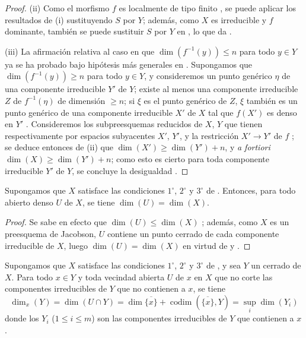 \begin{proof}
(ii) Como el morfismo $f$ es localmente de tipo finito , se puede aplicar los resultados de (i) sustituyendo $S$ por $Y$; además, como $X$ es irreducible y $f$ dominante, también se puede sustituir $S$ por $Y$ en , lo que da .

(iii) La afirmación relativa al caso en que $\dim(f^{-1}(y))\leq n$ para todo $y\in Y$ ya se ha probado bajo hipótesis más generales en .
Supongamos que $\dim(f^{-1}(y))\geq n$ para todo $y\in Y$, y consideremos un punto genérico $\eta$ de una componente irreducible $Y'$ de $Y$; existe al menos una componente irreducible $Z$ de $f^{-1}(\eta)$ de dimensión $\geq n$; si $\xi$ es el punto genérico de $Z$, $\xi$ también es un punto genérico de una componente irreducible $X'$ de $X$ tal que $f(X')$ es denso en $Y'$ .
Consideremos los subpreesquemas reducidos de $X$, $Y$ que tienen respectivamente por espacios subyacentes $X'$, $Y'$, y la restricción $X'\to Y'$ de $f$ ; se deduce entonces de (ii) que $\dim(X')\geq\dim(Y')+n$, y \emph{a fortiori} $\dim(X)\geq\dim(Y')+n$; como esto es cierto para toda componente irreducible $Y'$ de $Y$, se concluye la desigualdad .
\end{proof}

\begin{corollary}[10.6.2]
\label{IV.10.6.2}
Supongamos que $X$ satisface las condiciones $1^\circ$, $2^\circ$ y $3^\circ$ de .
Entonces, para todo abierto denso $U$ de $X$, se tiene $\dim(U)=\dim(X)$.
\end{corollary}

\begin{proof}
Se sabe en efecto que $\dim(U)\leq\dim(X)$ ; además, como $X$ es un preesquema de Jacobson, $U$ contiene un punto cerrado de cada componente irreducible de $X$, luego $\dim(U)=\dim(X)$ en virtud de  y .
\end{proof}

\begin{proposition}[10.6.3]
\label{IV.10.6.3}
Supongamos que $X$ satisface las condiciones $1^\circ$, $2^\circ$ y $3^\circ$ de , y sea $Y$ un cerrado de $X$.
Para todo $x\in Y$ y toda vecindad abierta $U$ de $x$ en $X$ que no corte las componentes irreducibles de $Y$ que no contienen a $x$, se tiene
\begin{equation}
\label{IV.10.6.3.1-fr}
\tag{10.6.3.1}
\dim_x(Y)=\dim(U\cap Y)=\dim\overline{\{x\}}
 +\operatorname{codim}(\overline{\{x\}},Y)=\sup_i\dim(Y_i)
\end{equation}
donde los $Y_i$ \textup{(}$1\leq i\leq m$\textup{)} son las componentes irreducibles de $Y$ que contienen a $x$.
\end{proposition}

